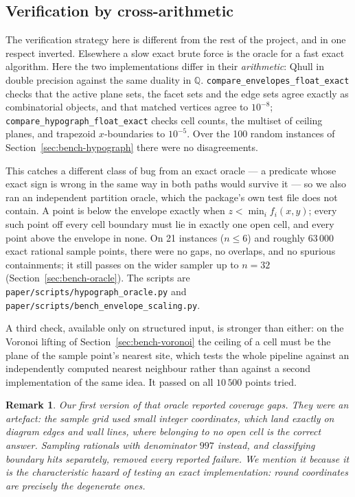 \documentclass[11pt]{article}
\newtheorem{remark}{Remark}
\begin{document}
\subsection{Verification by cross-arithmetic}

The verification strategy here is different from the rest of the project, and
in one respect inverted.  Elsewhere a slow exact brute force is the oracle for a
fast exact algorithm.  Here the two implementations differ in their
\emph{arithmetic}: Qhull in double precision against the same duality in
$\mathbb{Q}$.  \texttt{compare\_envelopes\_float\_exact} checks that the active
plane sets, the facet sets and the edge sets agree exactly as combinatorial
objects, and that matched vertices agree to $10^{-8}$;
\texttt{compare\_hypograph\_float\_exact} checks cell counts, the multiset of
ceiling planes, and trapezoid $x$-boundaries to $10^{-5}$.  Over the 100 random
instances of Section~\ref{sec:bench-hypograph} there were no disagreements.

This catches a different class of bug from an exact oracle --- a predicate whose
exact sign is wrong in the same way in both paths would survive it --- so we
also ran an independent partition oracle, which the package's own test file does
not contain.  A point is below the envelope exactly when
$z < \min_i f_i(x,y)$; every such point off every cell boundary must lie in
exactly one open cell, and every point above the envelope in none.  On 21
instances ($n \le 6$) and roughly $63\,000$ exact rational sample points, there
were no gaps, no overlaps, and no spurious containments; it still passes on the
wider sampler up to $n = 32$ (Section~\ref{sec:bench-oracle}).  The scripts are
\texttt{paper/scripts/hypograph\_oracle.py} and
\texttt{paper/scripts/bench\_envelope\_scaling.py}.

A third check, available only on structured input, is stronger than either: on
the Voronoi lifting of Section~\ref{sec:bench-voronoi} the ceiling of a cell
must be the plane of the sample point's nearest site, which tests the whole
pipeline against an independently computed nearest neighbour rather than against
a second implementation of the same idea.  It passed on all $10\,500$ points
tried.

\begin{remark}
Our first version of that oracle reported coverage gaps.  They were an artefact:
the sample grid used small integer coordinates, which land exactly on diagram
edges and wall lines, where belonging to no \emph{open} cell is the correct
answer.  Sampling rationals with denominator $997$ instead, and classifying
boundary hits separately, removed every reported failure.  We mention it because
it is the characteristic hazard of testing an exact implementation: round
coordinates are precisely the degenerate ones.
\end{remark}
\end{document}

